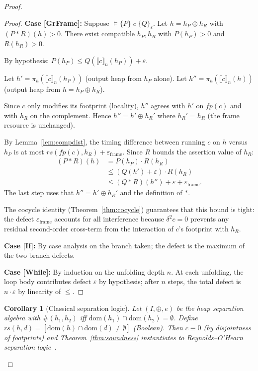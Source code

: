 \documentclass[acmsmall,sigplan,anonymous,review,screen]{acmart}
\theoremstyle{plain}
\newtheorem{corollary}[theorem]{Corollary}
\theoremstyle{definition}
\newcommand{\rs}{\mathit{rs}}
\newcommand{\fp}{\mathit{fp}}
\newcommand{\sep}{*}
\newcommand{\defect}{\varepsilon}
\begin{document}
\begin{proof}
\begin{proof}
  \medskip
  \noindent\textbf{Case [GrFrame]:}
  Suppose $\vDash \{P\}\; c\; \{Q\}_\defect$.  Let $h = h_P \oplus h_R$
  with $(P \sep R)(h) > 0$.  There exist compatible $h_P, h_R$ with
  $P(h_P) > 0$ and $R(h_R) > 0$.

  By hypothesis: $P(h_P) \leq Q(\llbracket c \rrbracket_n(h_P)) + \defect$.

  Let $h' = \pi_h(\llbracket c \rrbracket_n(h_P))$ (output heap from $h_P$ alone).
  Let $h'' = \pi_h(\llbracket c \rrbracket_n(h))$ (output heap from $h = h_P \oplus h_R$).

  Since $c$ only modifies its footprint (locality), $h''$ agrees with
  $h'$ on $\fp(c)$ and with $h_R$ on the complement.  Hence $h'' = h' \oplus h_R'$
  where $h_R' = h_R$ (the frame resource is unchanged).

  By Lemma~\ref{lem:compdist}, the timing difference between running $c$
  on $h$ versus $h_P$ is at most $\rs(\fp(c), h_R) + \defect_{\mathrm{frame}}$.
  Since $R$ bounds the assertion value of $h_R$:
  \begin{align*}
    (P \sep R)(h) &= P(h_P) \cdot R(h_R) \\
    &\leq (Q(h') + \defect) \cdot R(h_R) \\
    &\leq (Q \sep R)(h'') + \defect + \defect_{\mathrm{frame}}.
  \end{align*}
  The last step uses that $h'' = h' \oplus h_R'$ and the definition of $\sep$.

  The cocycle identity (Theorem~\ref{thm:cocycle}) guarantees that this
  bound is tight: the defect $\defect_{\mathrm{frame}}$ accounts for all
  interference because $\delta^2 c = 0$ prevents any residual second-order
  cross-term from the interaction of $c$'s footprint with $h_R$.

  \medskip
  \noindent\textbf{Case [If]:}
  By case analysis on the branch taken; the defect is the maximum of
  the two branch defects.

  \medskip
  \noindent\textbf{Case [While]:}
  By induction on the unfolding depth $n$.  At each unfolding, the
  loop body contributes defect $\defect$ by hypothesis; after $n$ steps,
  the total defect is $n \cdot \defect$ by linearity of $\leq$.
\end{proof}

\begin{corollary}[Classical separation logic]
\label{cor:sl-heap}
  Let $(I, \oplus, e)$ be the heap separation algebra with $\#(h_1, h_2)$
  iff $\mathrm{dom}(h_1) \cap \mathrm{dom}(h_2) = \emptyset$.  Define
  $\rs(h, d) = [\mathrm{dom}(h) \cap \mathrm{dom}(d) \neq \emptyset]$ (Boolean).
  Then $c \equiv 0$ (by disjointness of footprints) and
  Theorem~\ref{thm:soundness} instantiates to Reynolds--O'Hearn
  separation logic~\cite{reynolds2002separation}.
\end{corollary}


\end{proof}
\end{document}

